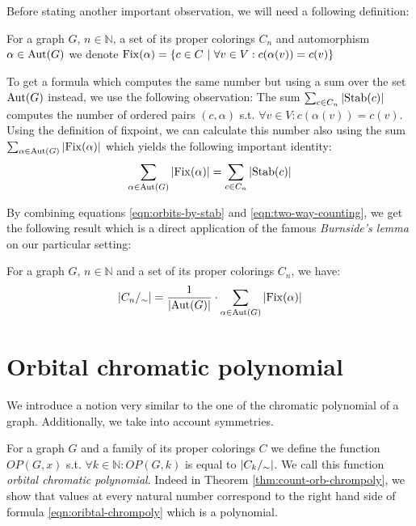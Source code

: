 Before stating another important observation, we will need a following definition:

\begin{defn}[fixpoint]
    For a graph $G$, $n \in \mathbb{N}$, a set of its proper colorings $C_n$ and automorphism $\alpha \in \operatorname{Aut}(G)$ we denote $\Fix(\alpha)= \{ c \in C \ | \ \forall v \in V : c(\alpha(v)) = c(v) \}$
\end{defn}

To get a formula which computes the same number but using a sum over the set $\operatorname{Aut}(G)$ instead, we use the following observation: The sum $\sum_{c \in C_n} \left|{\operatorname{Stab}(c)}\right|$ computes the number of ordered pairs $(c,\alpha)$ s.t. $\forall v \in V : c(\alpha(v)) = c(v)$. Using the definition of fixpoint, we can calculate this number also using the sum $\sum_{\alpha \in \operatorname{Aut}(G)} \left|{\operatorname{Fix}(\alpha)}\right|$ which yields the following important identity:
\begin{equation}\label{eqn:two-way-counting}
    \sum_{\alpha \in \operatorname{Aut}(G)} \left|{\operatorname{Fix}(\alpha)}\right| = \sum_{c \in C_n}\left|{\operatorname{Stab}(c)}\right|    
\end{equation}

By combining equations \ref{eqn:orbits-by-stab} and \ref{eqn:two-way-counting}, we get the following result which is a direct application of the famous \textit{Burnside's lemma} on our particular setting:

\begin{thm} \label{thm:burnside}
    For a graph $G$, $n \in \mathbb{N}$ and a set of its proper colorings $C_n$, we have:
    $$\left|{C_n/_\sim}\right| = \frac{1}{\left|{\operatorname{Aut}(G)}\right|}\cdot \sum_{\alpha \in \operatorname{Aut}(G)}\left|{\operatorname{Fix}(\alpha)}\right|$$
\end{thm}

\section{Orbital chromatic polynomial}

We introduce a notion very similar to the one of the chromatic polynomial of a graph. Additionally, we take into account symmetries.

\begin{highlight}

\begin{defn}
    For a graph $G$ and a family of its proper colorings $C$ we define the function $OP(G,x)$ s.t. $\forall k \in \mathbb{N} : OP(G,k)$ is equal to $\left|{C_k/_\sim}\right|$. We call this function \emph{orbital chromatic polynomial}. Indeed in Theorem \ref{thm:count-orb-chrompoly}, we show that values at every natural number correspond to the right hand side of formula \ref{eqn:oribtal-chrompoly} which is a polynomial.
\end{defn}

\end{highlight}


